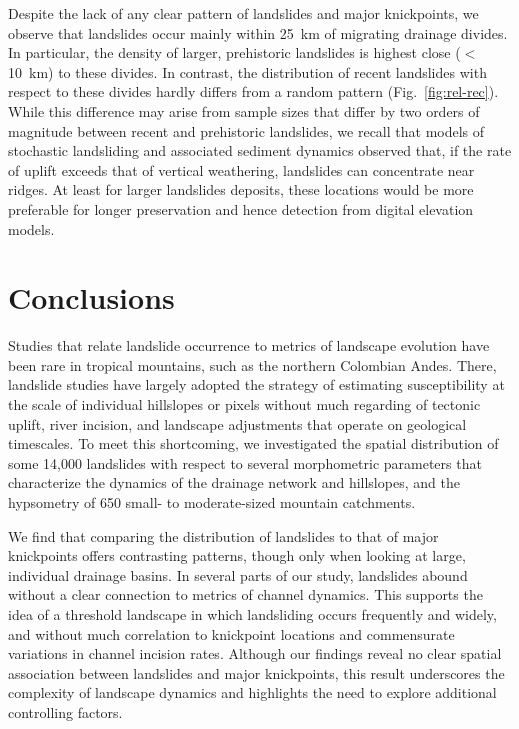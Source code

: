 \documentclass[draft]{agujournal2019}
\begin{document}
\par Despite the lack of any clear pattern of landslides and major knickpoints, we observe that landslides occur mainly within 25~km of migrating drainage divides. In particular, the density of larger, prehistoric landslides is highest close ($<$10~km) to these divides. In contrast, the distribution of recent landslides with respect to these divides hardly differs from a random pattern (Fig.~\ref{fig:rel-rec}). While this difference may arise from sample sizes that differ by two orders of magnitude between recent and prehistoric landslides, we recall that models of stochastic landsliding and associated sediment dynamics \cite{Campforts2020, Campforts2022} observed that, if the rate of uplift exceeds that of vertical weathering, landslides can concentrate near ridges. At least for larger landslides deposits, these locations would be more preferable for longer preservation and hence detection from digital elevation models.

\section{Conclusions}

\par Studies that relate landslide occurrence to metrics of landscape evolution have been rare in tropical mountains, such as the northern Colombian Andes. There, landslide studies have largely adopted the strategy of estimating susceptibility at the scale of individual hillslopes or pixels without much regarding of tectonic uplift, river incision, and landscape adjustments that operate on geological timescales. To meet this shortcoming, we investigated the spatial distribution of some 14,000 landslides with respect to several morphometric parameters that characterize the dynamics of the drainage network and hillslopes, and the hypsometry of 650 small- to moderate-sized mountain catchments.

\par We find that comparing the distribution of landslides to that of major knickpoints offers contrasting patterns, though only when looking at large, individual drainage basins. In several parts of our study, landslides abound without a clear connection to metrics of channel dynamics. This supports the idea of a threshold landscape in which landsliding occurs frequently and widely, and without much correlation to knickpoint locations and commensurate variations in channel incision rates. Although our findings reveal no clear spatial association between landslides and major knickpoints, this result underscores the complexity of landscape dynamics and highlights the need to explore additional controlling factors.
\end{document}
